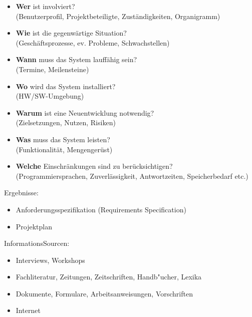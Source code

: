 %
\newpage
\begin{boxedminipage}{\linewidth}
\begin{itemize}
\item {\bfseries Wer} ist involviert?\\ 
(Benutzerprofil, Projektbeteiligte, Zuständigkeiten, Organigramm)
\item {\bfseries Wie} ist die gegenwärtige Situation?\\
  (Geschäftsprozesse, ev. Probleme, Schwachstellen)
\item {\bfseries Wann} muss das System lauffähig sein?\\
 (Termine, Meilensteine)
\item {\bfseries Wo} wird das System installiert?\\
  (HW/SW-Umgebung)
\item {\bfseries Warum} ist eine Neuentwicklung notwendig?\\
  (Zielsetzungen, Nutzen, Risiken)
\item {\bfseries Was} muss das System leisten?\\
 (Funktionalität, Mengengerüst)
\item {\bfseries Welche} Einschränkungen sind zu berücksichtigen?\\ 
(Programmiersprachen, Zuverlässigkeit, Antwortzeiten, Speicherbedarf etc.)
\end{itemize}
\end{boxedminipage}
\newslide
\vspace{0.5cm}

Ergebnisse:
\begin{itemize}
\item Anforderungsspezifikation (Requirements Specification)
\item Projektplan
\end{itemize}
InformationsSourcen:
\begin{itemize}
\item Interviews, Workshops
\item Fachliteratur, Zeitungen, Zeitschriften, Handb"ucher, Lexika
\item Dokumente, Formulare, Arbeitsanweisungen, Vorschriften
\item Internet
\end{itemize}
%
\newpage
